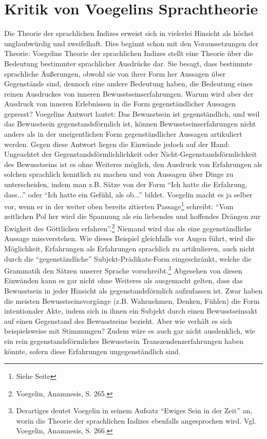 \section{Kritik von Voegelins Sprachtheorie}
\label{KritikSprache}

Die Theorie der sprachlichen Indizes erweist sich in vielerlei Hinsicht als
höchst unglaubwürdig und zweifelhaft. Dies beginnt schon mit den
Voraussetzungen der Theorie: Voegelins Theorie der sprachlichen Indizes
stellt eine Theorie über die Bedeutung bestimmter sprachlicher Ausdrücke dar.
Sie besagt, dass bestimmte sprachliche Äußerungen, obwohl sie von ihrer Form
her Aussagen über Gegenstände sind, dennoch eine andere Bedeutung haben, die
Bedeutung eines reinen Ausdruckes von inneren Bewusstseinserfahrungen. Warum
wird aber der Ausdruck von inneren Erlebnissen in die Form gegenständlicher
Aussagen gepresst? Voegelins Antwort lautet: Das Bewusstsein ist
gegenständlich, und weil das Bewusstsein gegenstandsförmlich ist, können
Bewusstseinserfahrungen nicht anders als in der uneigentlichen Form
gegenständlicher Aussagen artikuliert werden. Gegen diese Antwort liegen die
Einwände jedoch auf der Hand: Ungeachtet der Gegenstandsförmlichlichkeit oder
Nicht-Gegenstandsförmlichkeit des Bewusstseins ist es ohne Weiteres möglich,
den Ausdruck von Erfahrungen als solchen sprachlich kenntlich zu machen und
von Aussagen über Dinge zu unterscheiden, indem man z.B. Sätze von der Form
"`Ich hatte die Erfahrung, dass..."' oder "`Ich hatte ein Gefühl, als ob..."'
bildet. Voegelin macht es ja selber vor, wenn er in der weiter oben bereits
zitierten Passage\footnote{Siehe Seite \pageref{ZitatSeinserfahrung}}
schreibt: "`Vom zeitlichen Pol her wird die Spannung als ein liebendes und
hoffendes Drängen zur Ewigkeit des Göttlichen erfahren"'.\footnote{Voegelin,
  Anamnesis, S. 265.} Niemand wird das als eine gegenständliche Aussage
missverstehen. Wie dieses Beispiel gleichfalls vor Augen führt, wird die
Möglichkeit, Erfahrungen als Erfahrungen sprachlich zu artikulieren, auch
nicht durch die "`gegenständliche"' Subjekt-Prädikats-Form eingeschränkt,
welche die Grammatik den Sätzen unserer Sprache
vorschreibt.\footnote{Derartiges deutet Voegelin in seinem Aufsatz "`Ewiges
  Sein in der Zeit"' an, worin die Theorie der sprachlichen Indizes ebenfalls
  angesprochen wird. Vgl. Voegelin, Anamnesis, S. 266.} Abgesehen von diesen
Einwänden kann es gar nicht ohne Weiteres als ausgemacht gelten, dass das
Bewusstsein in jeder Hinsicht als gegenstandsförmlich aufzufassen ist.  Zwar
haben die meisten Bewusstseinsvorgänge (z.B. Wahrnehmen, Denken, Fühlen) die
Form intentionaler Akte, indem sich in ihnen ein Subjekt durch einen
Bewusstseinsakt auf einen Gegenstand des Bewusstseins bezieht.  Aber wie
verhält es sich beispielsweise mit Stimmungen? Zudem wäre es auch gar nicht
ausdenklich, wie ein rein gegenstandsförmliches Bewusstsein
Transzendenzerfahrungen haben könnte, sofern diese Erfahrungen
ungegenständlich sind.

